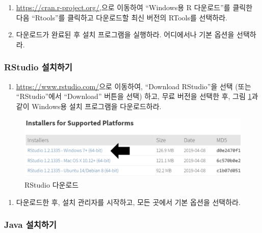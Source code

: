 \documentclass[11pt]{book}
\providecommand{\tightlist}{%
  \setlength{\itemsep}{0pt}\setlength{\parskip}{0pt}}
\theoremstyle{definition}
\theoremstyle{definition}
\theoremstyle{definition}
\theoremstyle{remark}
\begin{document}
\begin{enumerate}
\def\labelenumi{\arabic{enumi}.}
\item
  \url{https://cran.r-project.org/},으로 이동하여 ``Windows용 R
  다운로드''를 클릭한 다음 ``Rtools''를 클릭하고 다운로드할 최신 버전의
  RTools를 선택하라.
\item
  다운로드가 완료된 후 설치 프로그램을 실행하라. 어디에서나 기본 옵션을
  선택하라.
\end{enumerate}

\subsubsection*{RStudio 설치하기}\label{rstudio-}

\begin{enumerate}
\def\labelenumi{\arabic{enumi}.}
\tightlist
\item
  \url{https://www.rstudio.com/}으로 이동하여, ``Download RStudio''을
  선택 (또는 ``RStudio''에서 ``Download'' 버튼을 선택) 하고, 무료 버전을
  선택한 후, 그림 \ref{fig:downloadRStudio}과 같이 Windows용 설치
  프로그램을 다운로드하라.
\end{enumerate}

\begin{figure}

{\centering \includegraphics[width=1\linewidth]{images/OhdsiAnalyticsTools/downloadRStudio} 

}

\caption{RStudio 다운로드}\label{fig:downloadRStudio}
\end{figure}

\begin{enumerate}
\def\labelenumi{\arabic{enumi}.}
\setcounter{enumi}{1}
\tightlist
\item
  다운로드한 후, 설치 관리자를 시작하고, 모든 곳에서 기본 옵션을
  선택하라.
\end{enumerate}

\subsubsection*{Java 설치하기}\label{java-}
\end{document}
